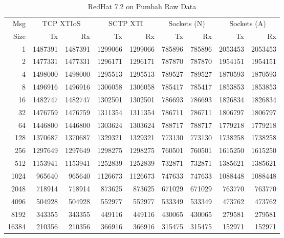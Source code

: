 \documentclass[letterpaper,final,notitlepage,twocolumn,10pt,twoside]{article}
\begin{document}
\begin{appendix}
\begin{table}[hbp]
\footnotesize
\begin{center}
\setlength{\tabcolsep}{0.2em}
\setlength{\arraycolsep}{0.2em}
\begin{tabular}{rrrrrrrrr}\\
Msg & \multicolumn{2}{c}{TCP XTIoS} & \multicolumn{2}{c}{SCTP XTI} & \multicolumn{2}{c}{Sockets (N)} & \multicolumn{2}{c}{Sockets (A)}\\
Size & Tx & Rx & Tx & Rx & Tx & Rx & Tx & Rx\\
\hline
\hline
1 & 1487391 & 1487391 & 1299066 & 1299066 & 785896 & 785896 & 2053453 & 2053453\\
2 & 1477331 & 1477331 & 1296171 & 1296171 & 787870 & 787870 & 1954151 & 1954151\\
4 & 1498000 & 1498000 & 1295513 & 1295513 & 789527 & 789527 & 1870593 & 1870593\\
8 & 1496916 & 1496916 & 1306058 & 1306058 & 785417 & 785417 & 1853853 & 1853853\\
16 & 1482747 & 1482747 & 1302501 & 1302501 & 786693 & 786693 & 1826834 & 1826834\\
32 & 1476759 & 1476759 & 1311354 & 1311354 & 786711 & 786711 & 1806797 & 1806797\\
64 & 1446800 & 1446800 & 1303624 & 1303624 & 788717 & 788717 & 1779218 & 1779218\\
128 & 1370687 & 1370687 & 1329321 & 1329321 & 773130 & 773130 & 1738258 & 1738258\\
256 & 1297649 & 1297649 & 1298275 & 1298275 & 760501 & 760501 & 1615250 & 1615250\\
512 & 1153941 & 1153941 & 1252839 & 1252839 & 732871 & 732871 & 1385621 & 1385621\\
1024 & 965640 & 965640 & 1126673 & 1126673 & 747633 & 747633 & 1088448 & 1088448\\
2048 & 718914 & 718914 & 873625 & 873625 & 671029 & 671029 & 763770 & 763770\\
4096 & 504928 & 504928 & 552977 & 552977 & 533349 & 533349 & 473762 & 473762\\
8192 & 343355 & 343355 & 449116 & 449116 & 430065 & 430065 & 279581 & 279581\\
16384 & 210356 & 210356 & 366916 & 366916 & 315475 & 315475 & 152971 & 152971\\
\hline
\end{tabular}
\end{center}
\normalsize
\caption[RedHat 7.2 on Pumbah Raw Data]{RedHat 7.2 on Pumbah Raw Data}
\label{table:rh72data}
\end{table}


\end{appendix}
\end{document}
